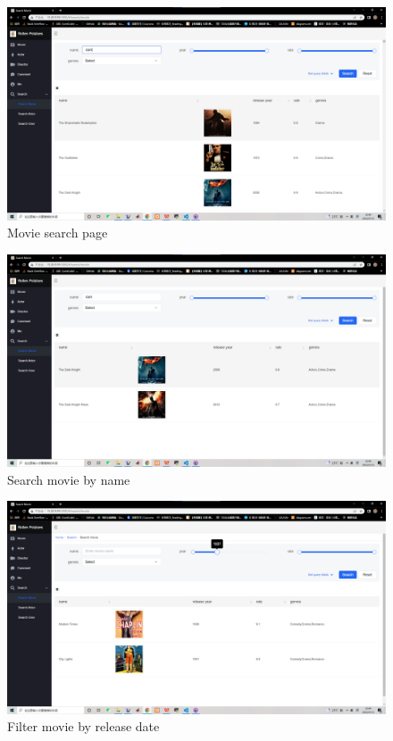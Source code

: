\begin{CJK*}{UTF8}{gbsn}
    \begin{figure}[htbp]
    \centering
    \includegraphics[width=1\textwidth]{res_search1.png}
    \caption{Movie search page}
    \end{figure}
    
    \begin{figure}[htbp]
    \centering
    \includegraphics[width=1\textwidth]{res_search2.png}
    \caption{Search movie by name}
    \end{figure}
    
    \begin{figure}[htbp]
    \centering
    \includegraphics[width=1\textwidth]{res_search3.png}
    \caption{Filter movie by release date}
    \end{figure}
    

\end{CJK*}
